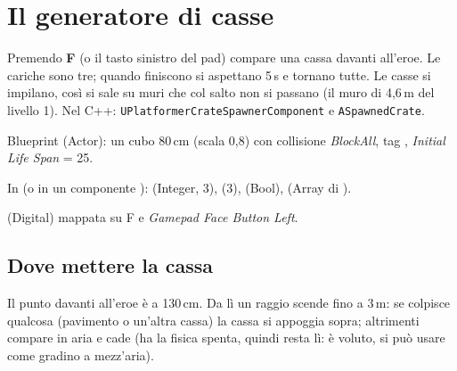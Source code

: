 \section{Il generatore di casse}

Premendo \textbf{F} (o il tasto sinistro del pad) compare una cassa davanti all'eroe. Le cariche sono tre; quando finiscono si aspettano 5\,s e tornano tutte. Le casse si impilano, così si sale su muri che col salto non si passano (il muro di 4,6\,m del livello 1). Nel C++: \texttt{UPlatformerCrateSpawnerComponent} e \texttt{ASpawnedCrate}.

\begin{ricetta}
  \item Blueprint  (Actor): un cubo 80\,cm (scala 0,8) con collisione \emph{BlockAll}, tag , \emph{Initial Life Span} = 25.
  \item In  (o in un componente ):  (Integer, 3),  (3),  (Bool),  (Array di ).
  \item {} (Digital) mappata su F e \emph{Gamepad Face Button Left}.
\end{ricetta}

\subsection{Dove mettere la cassa}

Il punto davanti all'eroe è a 130\,cm. Da lì un raggio scende fino a 3\,m: se colpisce qualcosa (pavimento o un'altra cassa) la cassa si appoggia sopra; altrimenti compare in aria e cade (ha la fisica spenta, quindi resta lì: è voluto, si può usare come gradino a mezz'aria).

\begin{bpgraph}
\end{bpgraph}

